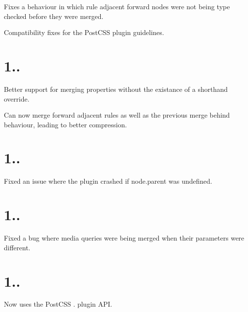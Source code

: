 \begin{DoxyItemize}
\item Fixes a behaviour in which rule adjacent forward nodes were not being type checked before they were merged.
\item Compatibility fixes for the Post\+C\+SS plugin guidelines.
\end{DoxyItemize}

\section*{1..}


\begin{DoxyItemize}
\item Better support for merging properties without the existance of a shorthand override.
\item Can now \textquotesingle{}merge forward\textquotesingle{} adjacent rules as well as the previous \textquotesingle{}merge behind\textquotesingle{} behaviour, leading to better compression.
\end{DoxyItemize}

\section*{1..}


\begin{DoxyItemize}
\item Fixed an issue where the plugin crashed if node.\+parent was undefined.
\end{DoxyItemize}

\section*{1..}


\begin{DoxyItemize}
\item Fixed a bug where media queries were being merged when their parameters were different.
\end{DoxyItemize}

\section*{1..}


\begin{DoxyItemize}
\item Now uses the Post\+C\+SS {.} plugin A\+PI.
\end{DoxyItemize}

